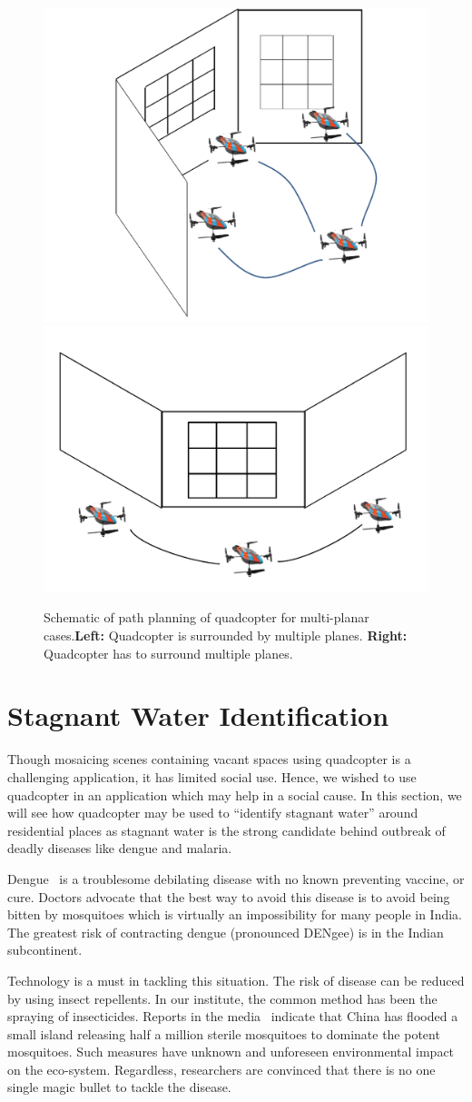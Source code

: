 \documentclass[11pt]{article}
\begin{document}
\begin{figure}[h!]
\centering
\includegraphics[width=0.45\linewidth]{furtherWork/pathInner}
\includegraphics[width=0.45\linewidth]{furtherWork/pathOuter}
\caption{Schematic of path planning of quadcopter for multi-planar
cases.\textbf{Left:} Quadcopter is surrounded by multiple planes. 
\textbf{Right:} Quadcopter has to surround multiple planes.}
\label{fig:pathInnerOuter}
\end{figure}

\section{Stagnant Water Identification}
Though mosaicing scenes containing vacant spaces using quadcopter is
a challenging application, it has limited social use. Hence, we wished to use
quadcopter in an application which may help in a social cause. In this section, we
will see how quadcopter may be used to ``identify stagnant water'' around
residential places as stagnant water is the strong candidate behind outbreak of
deadly diseases like dengue and malaria.

Dengue~\cite{WHO15Dengue} is a troublesome debilating disease with no
known preventing vaccine, or cure. Doctors advocate that the best way
to avoid this disease is to avoid being bitten by mosquitoes which is
virtually an impossibility for many people in India.  The greatest
risk of contracting dengue (pronounced DENgee) is in the Indian
subcontinent.  

Technology is a must in tackling this situation.  The risk of disease
can be reduced by using insect repellents. In our institute, the
common method has been the spraying of insecticides.  Reports in the
media~\cite{china} indicate that China has flooded a small island
releasing half a million sterile mosquitoes to dominate the potent
mosquitoes. Such measures have unknown and unforeseen environmental
impact on the eco-system. Regardless, researchers are convinced that
there is no one single magic bullet to tackle the disease. 
\end{document}
